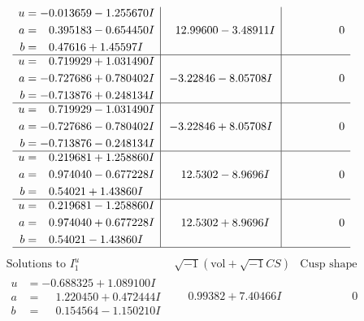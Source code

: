 \documentclass[1p]{elsarticle_modified}
\theoremstyle{definition}
\newcommand{\I}{\sqrt{-1}}
\begin{document}
$$\begin{array}{c|c|c}
\begin{aligned}
u &= -0.013659 - 1.255670 I \\
a &= \phantom{-}0.395183 - 0.654450 I \\
b &= \phantom{-}0.47616 + 1.45597 I\end{aligned}
 & \phantom{-}12.99600 - 3.48911 I & \phantom{-0.000000 } 0 \\ \hline\begin{aligned}
u &= \phantom{-}0.719929 + 1.031490 I \\
a &= -0.727686 + 0.780402 I \\
b &= -0.713876 + 0.248134 I\end{aligned}
 & -3.22846 - 8.05708 I & \phantom{-0.000000 } 0 \\ \hline\begin{aligned}
u &= \phantom{-}0.719929 - 1.031490 I \\
a &= -0.727686 - 0.780402 I \\
b &= -0.713876 - 0.248134 I\end{aligned}
 & -3.22846 + 8.05708 I & \phantom{-0.000000 } 0 \\ \hline\begin{aligned}
u &= \phantom{-}0.219681 + 1.258860 I \\
a &= \phantom{-}0.974040 - 0.677228 I \\
b &= \phantom{-}0.54021 + 1.43860 I\end{aligned}
 & \phantom{-}12.5302 - 8.9696 I & \phantom{-0.000000 } 0 \\ \hline\begin{aligned}
u &= \phantom{-}0.219681 - 1.258860 I \\
a &= \phantom{-}0.974040 + 0.677228 I \\
b &= \phantom{-}0.54021 - 1.43860 I\end{aligned}
 & \phantom{-}12.5302 + 8.9696 I & \phantom{-0.000000 } 0\\
 \hline 
 \end{array}$$\newpage$$\begin{array}{c|c|c}  
\text{Solutions to }I^u_{1}& \I (\text{vol} + \sqrt{-1}CS) & \text{Cusp shape}\\
 \hline 
\begin{aligned}
u &= -0.688325 + 1.089100 I \\
a &= \phantom{-}1.220450 + 0.472444 I \\
b &= \phantom{-}0.154564 - 1.150210 I\end{aligned}
 & \phantom{-}0.99382 + 7.40466 I & \phantom{-0.000000 } 0 \\ \hline\begin{aligned}

\end{aligned}
\end{array}$$
\end{document}
